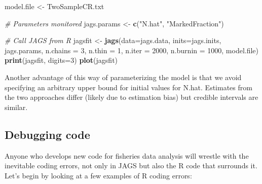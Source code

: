 \documentclass[
]{krantz}
\makeatletter
\newenvironment{Shaded}{\begin{snugshade}}{\end{snugshade}}
\newcommand{\AttributeTok}[1]{\textcolor[rgb]{0.27,0.27,0.27}{#1}}
\newcommand{\CommentTok}[1]{\textcolor[rgb]{0.37,0.37,0.37}{\textit{#1}}}
\newcommand{\DecValTok}[1]{\textcolor[rgb]{0.06,0.06,0.06}{#1}}
\newcommand{\FunctionTok}[1]{\textcolor[rgb]{0.27,0.27,0.27}{\textbf{#1}}}
\newcommand{\NormalTok}[1]{#1}
\newcommand{\OtherTok}[1]{\textcolor[rgb]{0.37,0.37,0.37}{#1}}
\newcommand{\StringTok}[1]{\textcolor[rgb]{0.5,0.5,0.5}{#1}}
\newenvironment{kframe}{%
\medskip{}
\setlength{\fboxsep}{.8em}
 \def\at@end@of@kframe{}%
 \ifinner\ifhmode%
  \def\at@end@of@kframe{\end{minipage}}%
  \begin{minipage}{\columnwidth}%
 \fi\fi%
 \def\FrameCommand##1{\hskip\@totalleftmargin \hskip-\fboxsep
 \colorbox{shadecolor}{##1}\hskip-\fboxsep
     \hskip-\linewidth \hskip-\@totalleftmargin \hskip\columnwidth}%
 \MakeFramed {\advance\hsize-\width
   \@totalleftmargin\z@ \linewidth\hsize
   \@setminipage}}%
 {\par\unskip\endMakeFramed%
 \at@end@of@kframe}
\renewenvironment{Shaded}{\begin{kframe}}{\end{kframe}}
\makeatother
\begin{document}
\begin{Shaded}
\begin{Highlighting}[]
\NormalTok{model.file }\OtherTok{\textless{}{-}} \StringTok{\textquotesingle{}TwoSampleCR.txt\textquotesingle{}}

\CommentTok{\# Parameters monitored}
\NormalTok{jags.params }\OtherTok{\textless{}{-}} \FunctionTok{c}\NormalTok{(}\StringTok{"N.hat"}\NormalTok{, }\StringTok{"MarkedFraction"}\NormalTok{)}

\CommentTok{\# Call JAGS from R}
\NormalTok{jagsfit }\OtherTok{\textless{}{-}} \FunctionTok{jags}\NormalTok{(}\AttributeTok{data=}\NormalTok{jags.data, }\AttributeTok{inits=}\NormalTok{jags.inits, jags.params,}
                \AttributeTok{n.chains =} \DecValTok{3}\NormalTok{, }\AttributeTok{n.thin =} \DecValTok{1}\NormalTok{, }\AttributeTok{n.iter =} \DecValTok{2000}\NormalTok{, }\AttributeTok{n.burnin =} \DecValTok{1000}\NormalTok{,}
\NormalTok{                model.file)}
\FunctionTok{print}\NormalTok{(jagsfit, }\AttributeTok{digits=}\DecValTok{3}\NormalTok{)}
\FunctionTok{plot}\NormalTok{(jagsfit)}
\end{Highlighting}
\end{Shaded}

Another advantage of this way of parameterizing the model is that we avoid specifying an arbitrary upper bound for initial values for N.hat. Estimates from the two approaches differ (likely due to estimation bias) but credible intervals are similar.

\hypertarget{Debug}{%
\subsection{Debugging code}\label{Debug}}

Anyone who develops new code for fisheries data analysis will wrestle with the inevitable coding errors, not only in JAGS but also the R code that surrounds it. Let's begin by looking at a few examples of R coding errors:
\end{document}
